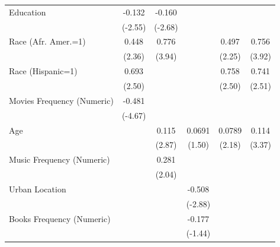 {\begin{longtable}{l*{5}{c}}
Education           &      -0.132\sym{*}&      -0.160\sym{*}&                   &                   &                   \\
                    &     (-2.55)       &     (-2.68)       &                   &                   &                   \\
Race (Afr. Amer.=1) &       0.448\sym{*}&       0.776\sym{*}&                   &       0.497\sym{*}&       0.756\sym{*}\\
                    &      (2.36)       &      (3.94)       &                   &      (2.25)       &      (3.92)       \\
Race (Hispanic=1)   &       0.693\sym{*}&                   &                   &       0.758\sym{*}&       0.741\sym{*}\\
                    &      (2.50)       &                   &                   &      (2.50)       &      (2.51)       \\
Movies Frequency (Numeric)&      -0.481\sym{*}&                   &                   &                   &                   \\
                    &     (-4.67)       &                   &                   &                   &                   \\
Age                 &                   &       0.115\sym{*}&      0.0691       &      0.0789\sym{*}&       0.114\sym{*}\\
                    &                   &      (2.87)       &      (1.50)       &      (2.18)       &      (3.37)       \\
Music Frequency (Numeric)&                   &       0.281\sym{*}&                   &                   &                   \\
                    &                   &      (2.04)       &                   &                   &                   \\
Urban Location      &                   &                   &      -0.508\sym{*}&                   &                   \\
                    &                   &                   &     (-2.88)       &                   &                   \\
Books Frequency (Numeric)&                   &                   &      -0.177       &                   &                   \\
                    &                   &                   &     (-1.44)       &                   &                   \\

\end{longtable}}
